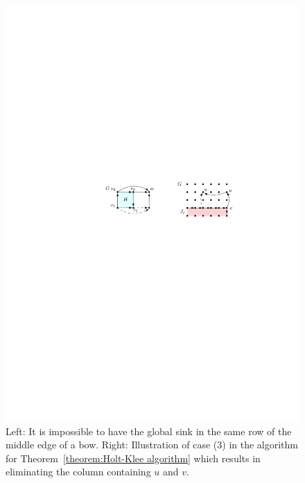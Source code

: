 \documentclass[runningheads,a4paper]{llncs}
\begin{document}
\begin{figure}[tb]
\centering
\includegraphics{HoltKlee.pdf}
\caption{\small Left: It is impossible to have the global sink in the same row of the middle edge of a bow. Right: Illustration of case (3) in the algorithm for Theorem~\ref{theorem:Holt-Klee algorithm} which results in eliminating the column containing $u$ and $v$.}
\label{fig:Bow example}
\end{figure}
\end{document}
